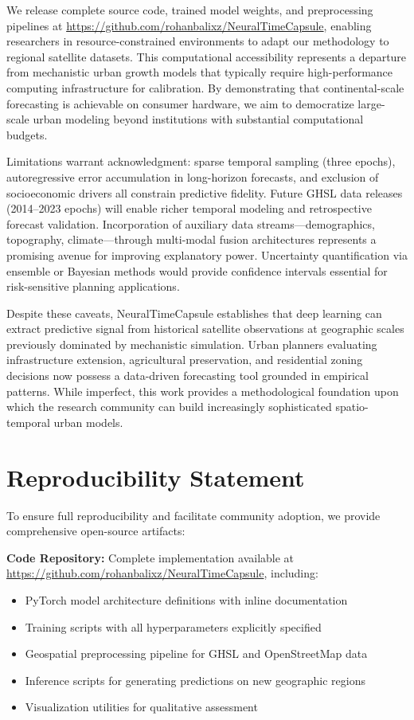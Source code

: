 \documentclass[conference]{IEEEtran}
\begin{document}
We release complete source code, trained model weights, and preprocessing pipelines at \url{https://github.com/rohanbalixz/NeuralTimeCapsule}, enabling researchers in resource-constrained environments to adapt our methodology to regional satellite datasets. This computational accessibility represents a departure from mechanistic urban growth models that typically require high-performance computing infrastructure for calibration. By demonstrating that continental-scale forecasting is achievable on consumer hardware, we aim to democratize large-scale urban modeling beyond institutions with substantial computational budgets.

Limitations warrant acknowledgment: sparse temporal sampling (three epochs), autoregressive error accumulation in long-horizon forecasts, and exclusion of socioeconomic drivers all constrain predictive fidelity. Future GHSL data releases (2014--2023 epochs) will enable richer temporal modeling and retrospective forecast validation. Incorporation of auxiliary data streams---demographics, topography, climate---through multi-modal fusion architectures represents a promising avenue for improving explanatory power. Uncertainty quantification via ensemble or Bayesian methods would provide confidence intervals essential for risk-sensitive planning applications.

Despite these caveats, NeuralTimeCapsule establishes that deep learning can extract predictive signal from historical satellite observations at geographic scales previously dominated by mechanistic simulation. Urban planners evaluating infrastructure extension, agricultural preservation, and residential zoning decisions now possess a data-driven forecasting tool grounded in empirical patterns. While imperfect, this work provides a methodological foundation upon which the research community can build increasingly sophisticated spatio-temporal urban models.

\section*{Reproducibility Statement}

To ensure full reproducibility and facilitate community adoption, we provide comprehensive open-source artifacts:

\textbf{Code Repository:} Complete implementation available at \url{https://github.com/rohanbalixz/NeuralTimeCapsule}, including:
\begin{itemize}
    \item PyTorch model architecture definitions with inline documentation
    \item Training scripts with all hyperparameters explicitly specified
    \item Geospatial preprocessing pipeline for GHSL and OpenStreetMap data
    \item Inference scripts for generating predictions on new geographic regions
    \item Visualization utilities for qualitative assessment
\end{itemize}
\end{document}
